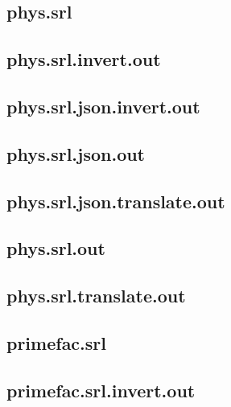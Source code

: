 \subsection{phys.srl}
\label{app:phys_srl}

\subsection{phys.srl.invert.out}
\label{app:phys_srl.invert.out}

\subsection{phys.srl.json.invert.out}
\label{app:phys_srl.json.invert.out}

\subsection{phys.srl.json.out}
\label{app:phys_srl.json.out}

\subsection{phys.srl.json.translate.out}
\label{app:phys_srl.json.translate.out}

\subsection{phys.srl.out}
\label{app:phys_srl.out}

\subsection{phys.srl.translate.out}
\label{app:phys_srl.translate.out}

\subsection{primefac.srl}
\label{app:primefac_srl}

\subsection{primefac.srl.invert.out}
\label{app:primefac_srl.invert.out}

